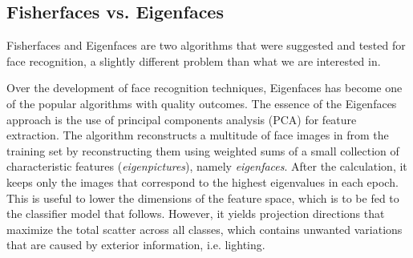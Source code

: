 \documentclass[10pt,twocolumn,letterpaper]{article}
\begin{document}
\subsection{Fisherfaces vs. Eigenfaces}
Fisherfaces \cite{Article06} and Eigenfaces \cite{Article07} are two algorithms that were suggested and tested for face recognition, a slightly different problem than what we are interested in.

Over the development of face recognition techniques, Eigenfaces has become one of the popular algorithms with quality outcomes. The essence of the Eigenfaces approach is the use of principal components analysis (PCA) for feature extraction. The algorithm reconstructs a multitude of face images in from the training set by reconstructing them using weighted sums of a small collection of characteristic features (\textit{eigenpictures}), namely \textit{eigenfaces}. After the calculation, it keeps only the images that correspond to the highest eigenvalues in each epoch. \cite{Article07} This is useful to lower the dimensions of the feature space, which is to be fed to the classifier model that follows. However, it yields projection directions that maximize the total scatter across all classes, which contains unwanted variations that are caused by exterior information, i.e. lighting. \cite{Article06}
\end{document}
